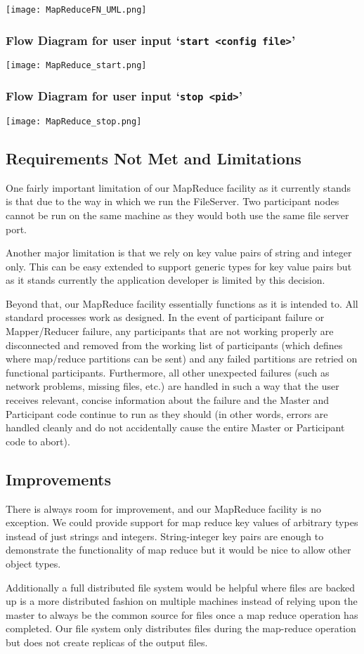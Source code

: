 \documentclass[12pt]{article}
\newcommand{\ttt}{\texttt}
\begin{document}
\texttt{[image: MapReduceFN\_UML.png]}

\subsubsection{Flow Diagram for user input `\ttt{start <config file>}'}
\texttt{[image: MapReduce\_start.png]}

\subsubsection{Flow Diagram for user input `\ttt{stop <pid>}'}
\texttt{[image: MapReduce\_stop.png]}

\subsection{Requirements Not Met and Limitations}

One fairly important limitation of our MapReduce facility as it currently stands is that due to the way in which we run the FileServer. Two participant nodes cannot be run on the same machine as they would both use the same file server port.

Another major limitation is that we rely on key value pairs of string and integer only. This can be easy extended to support generic types for key value pairs but as it stands currently the application developer is limited by this decision.

Beyond that, our MapReduce facility essentially functions as it is intended to. All standard processes work as designed. In the event of participant failure or Mapper/Reducer failure, any participants that are not working properly are disconnected and removed from the working list of participants (which defines where map/reduce partitions can be sent) and any failed partitions are retried on functional participants. Furthermore, all other unexpected failures (such as network problems, missing files, etc.) are handled in such a way that the user receives relevant, concise information about the failure and the Master and Participant code continue to run as they should (in other words, errors are handled cleanly and do not accidentally cause the entire Master or Participant code to abort).

\subsection{Improvements}

There is always room for improvement, and our MapReduce facility is no exception. We could provide support for map reduce key values of arbitrary types instead of just strings and integers. String-integer key pairs are enough to demonstrate the functionality of map reduce but it would be nice to allow other object types.

Additionally a full distributed file system would be helpful where files are backed up is a more distributed fashion on multiple machines instead of relying upon the master to always be the common source for files once a map reduce operation has completed. Our file system only distributes files during the map-reduce operation but does not create replicas of the output files.
\end{document}
